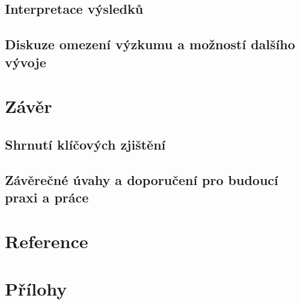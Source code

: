 \documentclass[FM,Proj]{tulthesis}
\begin{document}
\section{Interpretace výsledků}
\section{Diskuze omezení výzkumu a možností dalšího vývoje}

\chapter{Závěr}
\section{Shrnutí klíčových zjištění}
\section{Závěrečné úvahy a doporučení pro budoucí praxi a práce}

\chapter{Reference}
\printbibliography[heading=none]

\chapter{Přílohy}
\end{document}
